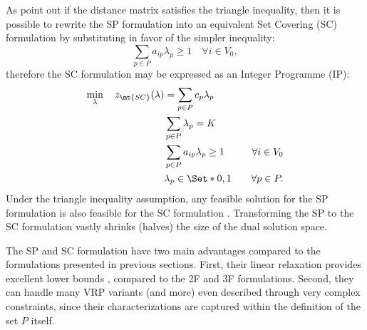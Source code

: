 As \textcite{toth2002} point out if the distance matrix satisfies the triangle inequality,
then it is possible to rewrite the SP formulation into an equivalent Set Covering (SC) formulation
by substituting 
in favor of the simpler inequality:
\begin{equation}\label{eq:set-covering-customers-visited-by-exactly-one-route}
	\sum_{p \in P}  a_{ip} \lambda_p \ge 1  \quad \forall i \in V_0,
\end{equation}
therefore the SC formulation may be expressed as an Integer Programme (IP):
\begin{align}
	\min_{\lambda} \quad z_\mt{SC}(\lambda) & = \sum_{p \in P}  c_p \lambda_p              & \label{eq:set-covering-obj-func}                                                       \\
	                                        & \sum_{p \in P} \lambda_{p} = K               & \label{eq:set-covering-K-routes}                                                       \\
	                                        & \sum_{p \in P}  a_{ip} \lambda_p \ge 1       & \quad \forall i \in V_0 \label{eq:set-covering-customers-visited-by-exactly-one-route} \\
	                                        & \lambda_p                    \in \Set*{0, 1} & \quad \forall p \in P \label{eq:set-covering-lambda-mip-var-bounds}.
\end{align}
Under the triangle inequality assumption,
any feasible solution for the SP formulation
is also feasible for the SC formulation
.
Transforming the SP to the SC formulation vastly shrinks (halves) the size of the dual solution space.

\medskip

The SP and SC formulation have two main advantages compared to the formulations presented in previous sections.
First, their linear relaxation provides excellent lower bounds \parencite{bramel1997},
compared to the 2F and 3F formulations.
Second, they can handle many VRP variants (and more)
even described through very complex constraints,
since their characterizations are captured within the definition of the set $P$ itself.
